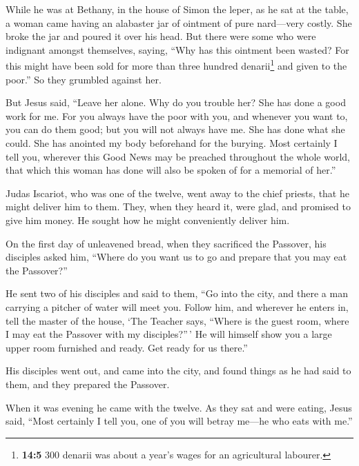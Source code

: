  While he was at Bethany, in the house of Simon the leper,
as he sat at the table, a woman came having an alabaster jar of ointment
of pure nard---very costly. She broke the jar and poured it over his
head.  But there were some who were indignant amongst
themselves, saying, ``Why has this ointment been wasted? 
For this might have been sold for more than three hundred
denarii\footnote{\textbf{14:5} 300 denarii was about a year's wages for
  an agricultural labourer.} and given to the poor.'' So they grumbled
against her.

 But Jesus said, ``Leave her alone. Why do you trouble
her? She has done a good work for me.  For you always have
the poor with you, and whenever you want to, you can do them good; but
you will not always have me.  She has done what she could.
She has anointed my body beforehand for the burying.  Most
certainly I tell you, wherever this Good News may be preached throughout
the whole world, that which this woman has done will also be spoken of
for a memorial of her.''

 Judas Iscariot, who was one of the twelve, went away to
the chief priests, that he might deliver him to them. 
They, when they heard it, were glad, and promised to give him money. He
sought how he might conveniently deliver him.

 On the first day of unleavened bread, when they
sacrificed the Passover, his disciples asked him, ``Where do you want us
to go and prepare that you may eat the Passover?''

 He sent two of his disciples and said to them, ``Go into
the city, and there a man carrying a pitcher of water will meet you.
Follow him,  and wherever he enters in, tell the master
of the house, `The Teacher says, ``Where is the guest room, where I may
eat the Passover with my disciples?''\,'  He will himself
show you a large upper room furnished and ready. Get ready for us
there.''

 His disciples went out, and came into the city, and
found things as he had said to them, and they prepared the Passover.

 When it was evening he came with the twelve.
 As they sat and were eating, Jesus said, ``Most
certainly I tell you, one of you will betray me---he who eats with me.''

